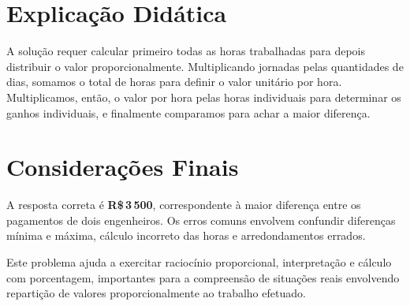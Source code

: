\documentclass{article}
\begin{document}
\section{Explicação Didática}

A solução requer calcular primeiro todas as horas trabalhadas para depois distribuir o valor proporcionalmente. Multiplicando jornadas pelas quantidades de dias, somamos o total de horas para definir o valor unitário por hora. Multiplicamos, então, o valor por hora pelas horas individuais para determinar os ganhos individuais, e finalmente comparamos para achar a maior diferença.

\section{Considerações Finais}

A resposta correta é \textbf{R\$\,3\,500}, correspondente à maior diferença entre os pagamentos de dois engenheiros. Os erros comuns envolvem confundir diferenças mínima e máxima, cálculo incorreto das horas e arredondamentos errados.

Este problema ajuda a exercitar raciocínio proporcional, interpretação e cálculo com porcentagem, importantes para a compreensão de situações reais envolvendo repartição de valores proporcionalmente ao trabalho efetuado.
\end{document}
